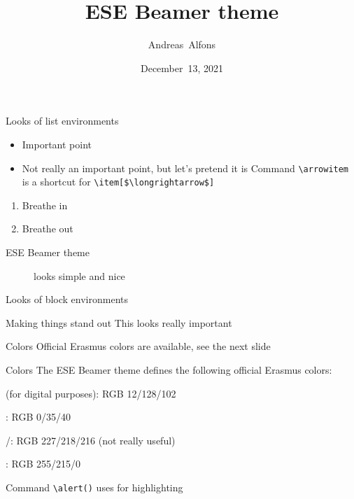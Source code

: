 \documentclass[pdfpagelabels=false, usepdftitle=false]{beamer}
\title{ESE Beamer theme}
\author{
  Andreas~Alfons
}
\institute[EUR]{
}
\date{December~13, 2021}
\begin{document}
\ESEtitleframe  %

\begin{frame}[fragile]{Looks of list environments}
\begin{itemize}
  \item Important point
  \item Not really an important point, but let's pretend it is
  \arrowitem Command \verb+\arrowitem+ is a shortcut for
  \verb+\item[$\longrightarrow$]+
\end{itemize}

\vfill

\begin{enumerate}
  \item Breathe in
  \item Breathe out
\end{enumerate}

\vfill

\begin{description}
  \item[ESE Beamer theme] looks simple and nice
\end{description}
\end{frame}

\begin{frame}[fragile]{Looks of block environments}
\begin{block}{Making things stand out}
This looks really important
\end{block}

\vfill

\begin{alertblock}{Colors}
Official Erasmus colors are available, see the next slide
\end{alertblock}
\end{frame}


\begin{frame}[fragile]{Colors}
The ESE Beamer theme defines the following official Erasmus colors:

\bigskip
\textcolor{EURbrightgreen}{} (for digital purposes):
RGB 12/128/102

\medskip
\textcolor{EURgreen}{}: RGB 0/35/40

\medskip
\textcolor{EURwarmgrey}{/}: RGB 227/218/216
{\small (not really useful)}

\medskip
\textcolor{ESEyellow}{}: RGB 255/215/0

\vfill

\begin{itemize}
  \arrowitem Command \verb+\alert()+ uses \alert{} for
  highlighting
\end{itemize}
\end{frame}
\end{document}

